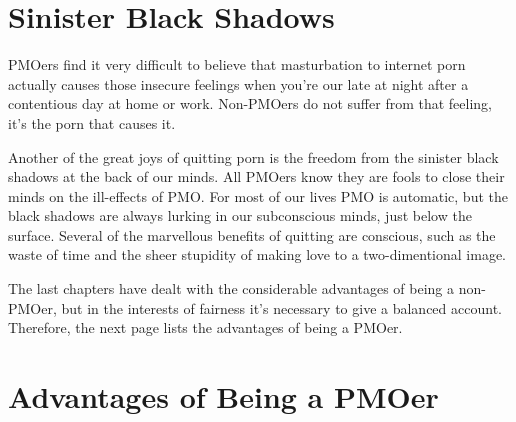 \documentclass[easypeasy.tex]{subfiles}
\begin{document}
\section{Sinister Black Shadows}

PMOers find it very difficult to believe that masturbation to internet porn actually causes those insecure feelings when you're our late at night after a contentious day at home or work. Non-PMOers do not suffer from that feeling, it's the porn that causes it.

Another of the great joys of quitting porn is the freedom from the sinister black shadows at the back of our minds. All PMOers know they are fools to close their minds on the ill-effects of PMO. For most of our lives PMO is automatic, but the black shadows are always lurking in our subconscious minds, just below the surface. Several of the marvellous benefits of quitting are conscious, such as the waste of time and the sheer stupidity of making love to a two-dimentional image. 

The last chapters have dealt with the considerable advantages of being a non-PMOer, but in the interests of fairness it's necessary to give a balanced account. Therefore, the next page lists the advantages of being a PMOer.

\newpage
\section{Advantages of Being a PMOer}
\end{document}
